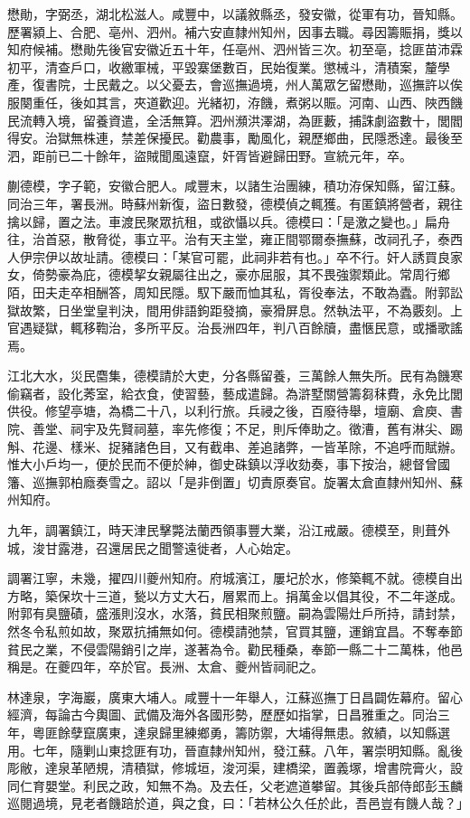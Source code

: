 \begin{pinyinscope}
懋勛，字弼丞，湖北松滋人。咸豐中，以議敘縣丞，發安徽，從軍有功，晉知縣。歷署潁上、合肥、亳州、泗州。補六安直隸州知州，因事去職。尋因籌賑捐，獎以知府候補。懋勛先後官安徽近五十年，任亳州、泗州皆三次。初至亳，捻匪苗沛霖初平，清查戶口，收繳軍械，平毀寨堡數百，民始復業。懲械斗，清積案，釐學產，復書院，士民戴之。以父憂去，會巡撫過境，州人萬眾乞留懋勛，巡撫許以俟服闋重任，後如其言，夾道歡迎。光緒初，洊饑，煮粥以賑。河南、山西、陜西饑民流轉入境，留養資遣，全活無算。泗州瀕洪澤湖，為匪藪，捕誅劇盜數十，閭閻得安。治獄無株連，禁差保擾民。勸農事，勵風化，親歷鄉曲，民隱悉達。最後至泗，距前已二十餘年，盜賊聞風遠竄，奸胥皆避歸田野。宣統元年，卒。

蒯德模，字子範，安徽合肥人。咸豐末，以諸生治團練，積功洊保知縣，留江蘇。同治三年，署長洲。時蘇州新復，盜日數發，德模偵之輒獲。有匿鎮將營者，親往擒以歸，置之法。車渡民聚眾抗租，或欲懾以兵。德模曰：「是激之變也。」扁舟往，治首惡，散脅從，事立平。治有天主堂，雍正間鄂爾泰撫蘇，改祠孔子，泰西人伊宗伊以故址請。德模曰：「某官可罷，此祠非若有也。」卒不行。奸人誘買良家女，倚勢豪為庇，德模挈女親屬往出之，豪亦屈服，其不畏強禦類此。常周行鄉陌，田夫走卒相酬答，周知民隱。馭下嚴而恤其私，胥役奉法，不敢為蠹。附郭訟獄故繁，日坐堂皇判決，間用俳語鉤距發摘，豪猾屏息。然執法平，不為覈刻。上官遇疑獄，輒移鞫治，多所平反。治長洲四年，判八百餘牘，盡愜民意，或播歌謠焉。

江北大水，災民麕集，德模請於大吏，分各縣留養，三萬餘人無失所。民有為饑寒偷竊者，設化莠室，給衣食，使習藝，藝成遣歸。為滸墅關營籌芻秣費，永免比閭供役。修望亭塘，為橋二十八，以利行旅。兵祲之後，百廢待舉，壇廟、倉庾、書院、善堂、祠宇及先賢祠墓，率先修復；不足，則斥俸助之。徵漕，舊有淋尖、踢斛、花邊、樣米、捉豬諸色目，又有截串、差追諸弊，一皆革除，不追呼而賦辦。惟大小戶均一，便於民而不便於紳，御史硃鎮以浮收劾奏，事下按治，總督曾國籓、巡撫郭柏廕奏雪之。詔以「是非倒置」切責原奏官。旋署太倉直隸州知州、蘇州知府。

九年，調署鎮江，時天津民擊斃法蘭西領事豐大業，沿江戒嚴。德模至，則葺外城，浚甘露港，召還居民之聞警遠徙者，人心始定。

調署江寧，未幾，擢四川夔州知府。府城濱江，屢圮於水，修築輒不就。德模自出方略，築保坎十三道，甃以方丈大石，層累而上。捐萬金以倡其役，不二年遂成。附郭有臭鹽磧，盛漲則沒水，水落，貧民相聚煎鹽。嗣為雲陽灶戶所持，請封禁，然冬令私煎如故，聚眾抗捕無如何。德模請弛禁，官買其鹽，運銷宜昌。不奪奉節貧民之業，不侵雲陽銷引之岸，遂著為令。勸民種桑，奉節一縣二十二萬株，他邑稱是。在夔四年，卒於官。長洲、太倉、夔州皆祠祀之。

林達泉，字海巖，廣東大埔人。咸豐十一年舉人，江蘇巡撫丁日昌闢佐幕府。留心經濟，每論古今輿圖、武備及海外各國形勢，歷歷如指掌，日昌雅重之。同治三年，粵匪餘孽竄廣東，達泉歸里練鄉勇，籌防禦，大埔得無患。敘績，以知縣選用。七年，隨剿山東捻匪有功，晉直隸州知州，發江蘇。八年，署崇明知縣。亂後彫敝，達泉革陋規，清積獄，修城垣，浚河渠，建橋梁，置義塚，增書院膏火，設同仁育嬰堂。利民之政，知無不為。及去任，父老遮道攀留。其後兵部侍郎彭玉麟巡閱過境，見老者饑踣於道，與之食，曰：「若林公久任於此，吾邑豈有饑人哉？」


\end{pinyinscope}
